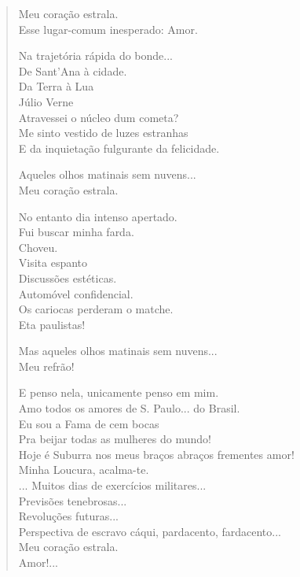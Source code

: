 \begin{verse}
Meu coração estrala.\\
Esse lugar-comum inesperado: Amor.

\quad\quad\quad{}Na trajetória rápida do bonde...\\
\quad\quad\quad\quad{}De Sant'Ana à cidade.\\
\quad\quad\quad\quad\quad{}Da Terra à Lua\\
\quad\quad\quad\quad\quad\quad{}Júlio Verne\\
\quad\quad\quad\quad\quad{}Atravessei o núcleo dum cometa?\\
\quad\quad\quad\quad{}Me sinto vestido de luzes estranhas\\
\quad\quad\quad\quad{}E da inquietação fulgurante da felicidade.

Aqueles olhos matinais sem nuvens...\\
Meu coração estrala.

No entanto dia intenso apertado.\\
\quad\quad\quad\quad{}Fui buscar minha farda.\\
\quad\quad\quad\quad{}Choveu.\\
\quad\quad\quad\quad{}Visita espanto\\
\quad\quad\quad\quad{}Discussões estéticas.\\
\quad\quad\quad\quad{}Automóvel confidencial.\\
\quad\quad\quad\quad{}Os cariocas perderam o matche.\\
\quad\quad\quad\quad{}Eta paulistas!

Mas aqueles olhos matinais sem nuvens...\\
Meu refrão!

E penso nela, unicamente penso em mim.\\
Amo todos os amores de S. Paulo... do Brasil.\\
Eu sou a Fama de cem bocas\\
Pra beijar todas as mulheres do mundo!\\
Hoje é Suburra nos meus braços abraços frementes amor!\\
Minha Loucura, acalma-te.\\
... Muitos dias de exercícios militares...\\
\quad\quad\quad\quad{}Previsões tenebrosas...\\
\quad\quad\quad\quad\quad\quad{}Revoluções futuras...\\
Perspectiva de escravo cáqui, pardacento, fardacento...\\

Meu coração estrala.\\
Amor!...
\end{verse}

